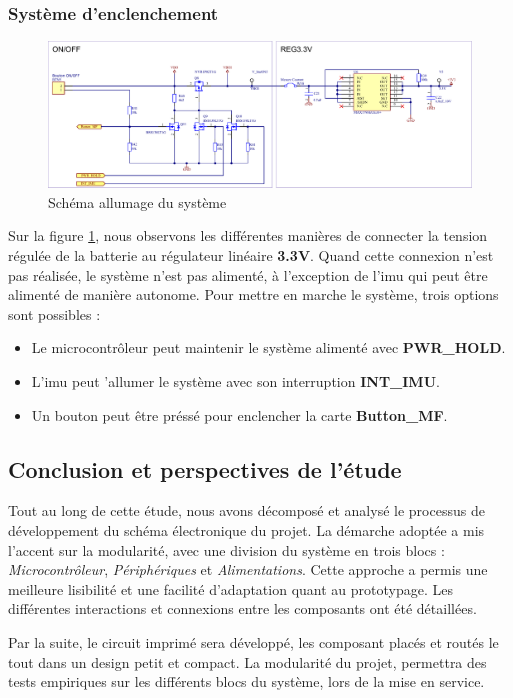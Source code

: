 \clearpage

\subsubsection{Système d'enclenchement} \label{sssec:On-OFF}


\begin{figure}[h]
	\centering
	\includegraphics[width=1\linewidth]{../figures/etude/sch/ON-OFF}
	\caption{Schéma allumage du système}
	\label{fig:on-off}
\end{figure}

Sur la figure \ref{fig:on-off}, nous observons les différentes manières de connecter la tension régulée de la batterie au régulateur linéaire \textbf{3.3V}. Quand cette connexion n'est pas réalisée, le système n'est pas alimenté, à l'exception de l'\gls{imu} qui peut être alimenté de manière autonome. Pour mettre en marche le système, trois options sont possibles : \vspace{2mm}

\begin{itemize}
	\item[\faChevronRight] Le microcontrôleur peut maintenir le système alimenté avec \textbf{PWR\_HOLD}. 
	\item[\faChevronRight] L'\gls{imu} peut 'allumer le système avec son interruption \textbf{INT\_IMU}. 
	\item[\faChevronRight] Un bouton peut être préssé pour enclencher la carte \textbf{Button\_MF}. 
\end{itemize}

\subsection{Conclusion et perspectives de l'étude} \label{ssec:Conclusion-etude}

Tout au long de cette étude, nous avons décomposé et analysé le processus de développement du schéma électronique du projet. La démarche adoptée a mis l'accent sur la modularité, avec une division du système en trois blocs : \textit{Microcontrôleur}, \textit{Périphériques} et \textit{Alimentations}. Cette approche a permis une meilleure lisibilité et une facilité d'adaptation quant au prototypage. Les différentes interactions et connexions entre les composants ont été détaillées.

Par la suite, le circuit imprimé sera développé, les composant placés et routés le tout dans un design petit et compact. La modularité du projet, permettra des tests empiriques sur les différents blocs du système, lors de la mise en service.


